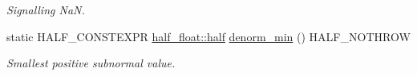 \begin{DoxyCompactItemize}
\begin{DoxyCompactList}\small\item\em Signalling NaN. \end{DoxyCompactList}\item 
static H\+A\+L\+F\+\_\+\+C\+O\+N\+S\+T\+E\+X\+PR \hyperlink{classhalf__float_1_1half}{half\+\_\+float\+::half} \hyperlink{classstd_1_1numeric__limits_3_01half__float_1_1half_01_4_ae6c0f9e198bc76d3edd0565e11c63664}{denorm\+\_\+min} () H\+A\+L\+F\+\_\+\+N\+O\+T\+H\+R\+OW\hypertarget{classstd_1_1numeric__limits_3_01half__float_1_1half_01_4_ae6c0f9e198bc76d3edd0565e11c63664}{}\label{classstd_1_1numeric__limits_3_01half__float_1_1half_01_4_ae6c0f9e198bc76d3edd0565e11c63664}

\begin{DoxyCompactList}\small\item\em Smallest positive subnormal value. \end{DoxyCompactList}\end{DoxyCompactItemize}
